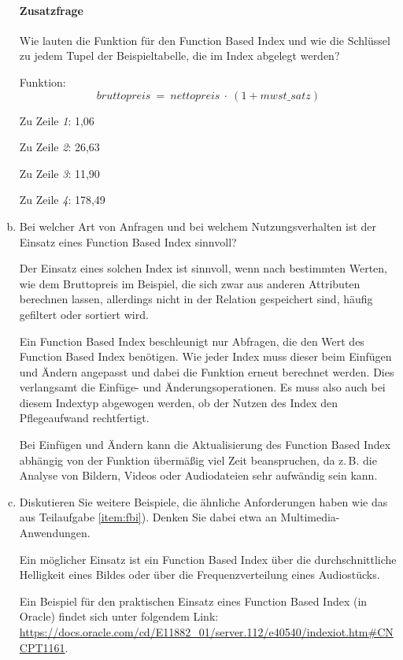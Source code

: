 \begin{enumerate}[a)]
\begin{solution}
\paragraph{Zusatzfrage} Wie lauten die Funktion für den Function Based Index und wie die Schlüssel zu jedem Tupel der Beispieltabelle, die im Index abgelegt werden?

Funktion:
\begin{equation*}
bruttopreis~ =~ nettopreis~ \cdot~ (1 + mwst\_satz)
\end{equation*}

Zu Zeile \textit{1}: 1,06

Zu Zeile \textit{2}: 26,63

Zu Zeile \textit{3}: 11,90

Zu Zeile \textit{4}: 178,49
\end{solution}

\item Bei welcher Art von Anfragen und bei welchem Nutzungsverhalten ist der Einsatz eines Function Based Index sinnvoll?

\begin{solution}
Der Einsatz eines solchen Index ist sinnvoll, wenn nach bestimmten Werten, wie dem Bruttopreis im Beispiel, die sich zwar aus anderen Attributen berechnen lassen, allerdings nicht in der Relation gespeichert sind, häufig gefiltert oder sortiert wird.

Ein Function Based Index beschleunigt nur Abfragen, die den Wert des Function Based Index benötigen.
Wie jeder Index muss dieser beim Einfügen und Ändern angepasst und dabei die Funktion erneut berechnet werden.
Dies verlangsamt die Einfüge- und Änderungsoperationen. Es muss also auch bei diesem Indextyp abgewogen werden, ob der Nutzen des Index den Pflegeaufwand rechtfertigt.

Bei Einfügen und Ändern kann die Aktualisierung des Function Based Index abhängig von der Funktion übermäßig viel Zeit beanspruchen, da z.\,B. die Analyse von Bildern, Videos oder Audiodateien sehr aufwändig sein kann.
\end{solution}

\item Diskutieren Sie weitere Beispiele, die ähnliche Anforderungen haben wie das aus Teilaufgabe \ref{item:fbi}). Denken Sie dabei etwa an Multimedia-Anwendungen.

\begin{solution}
Ein möglicher Einsatz ist ein Function Based Index über die durchschnittliche Helligkeit eines Bildes oder über die Frequenzverteilung eines Audiostücks.

Ein Beispiel für den praktischen Einsatz eines Function Based Index (in Oracle) findet sich unter folgendem Link:\\
\url{https://docs.oracle.com/cd/E11882\_01/server.112/e40540/indexiot.htm\#CNCPT1161}.

\end{solution}

\end{enumerate}
